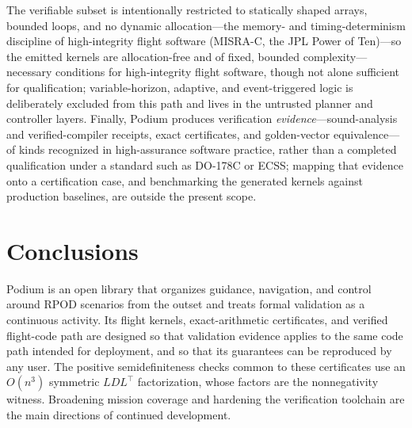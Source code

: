 \documentclass[11pt]{article}
\begin{document}
The verifiable subset is intentionally restricted to statically shaped arrays,
bounded loops, and no dynamic allocation---the memory- and timing-determinism
discipline of high-integrity flight software (MISRA-C, the JPL Power of Ten)---so
the emitted kernels are allocation-free and of fixed, bounded complexity---necessary
conditions for high-integrity flight software, though not alone sufficient for
qualification; variable-horizon, adaptive, and event-triggered
logic is deliberately excluded from this path and lives in the untrusted planner
and controller layers. Finally, Podium produces verification
\emph{evidence}---sound-analysis and verified-compiler receipts, exact
certificates, and golden-vector equivalence---of kinds recognized in
high-assurance software practice, rather than a completed qualification under a
standard such as DO-178C or ECSS; mapping that evidence onto a certification case,
and benchmarking the generated kernels against production baselines,
are outside the present scope.

\section{Conclusions}

Podium is an open library that organizes guidance, navigation, and control around
RPOD scenarios from the outset and treats formal validation as a continuous
activity. Its flight kernels, exact-arithmetic certificates, and verified
flight-code path are designed so that validation evidence applies to the same
code path intended for deployment, and so that its guarantees can be reproduced by
any user. The positive semidefiniteness checks common to these certificates use
an $O(n^3)$ symmetric $LDL^\top$ factorization, whose factors are the
nonnegativity witness. Broadening mission coverage and hardening the verification
toolchain are the main directions of continued development.



\end{document}
